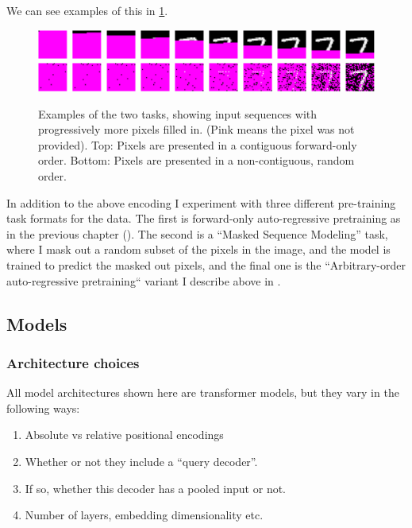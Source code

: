 We can see examples of this in \cref{fig:mnist-task-examples}.

\begin{figure}
    \centering
    \includegraphics[width=0.7\linewidth]{figures/examples-sequential.png}
    \includegraphics[width=0.7\linewidth]{figures/examples-random.png}
    \caption[Examples of the two MNIST training tasks]{Examples of the two tasks, showing input sequences with progressively more pixels filled in. (Pink means the pixel was not provided). Top: Pixels are presented in a contiguous forward-only order. Bottom: Pixels are presented in a non-contiguous, random order.}
    \label{fig:mnist-task-examples}
\end{figure}

In addition to the above encoding I experiment with three different pre-training task formats for the data. The first is forward-only auto-regressive pretraining as in the previous chapter (). The second is a ``Masked Sequence Modeling'' task, where I mask out a random subset of the pixels in the image, and the model is trained to predict the masked out pixels, and the final one is the ``Arbitrary-order auto-regressive pretraining`` variant I describe above in .

\subsection{Models}

\subsubsection{Architecture choices}

All model architectures shown here are transformer models, but they vary in the following ways:

\begin{enumerate}
    \item Absolute vs relative positional encodings
    \item Whether or not they include a ``query decoder''.
    \item If so, whether this decoder has a pooled input or not.
    \item Number of layers, embedding dimensionality etc.
\end{enumerate}



